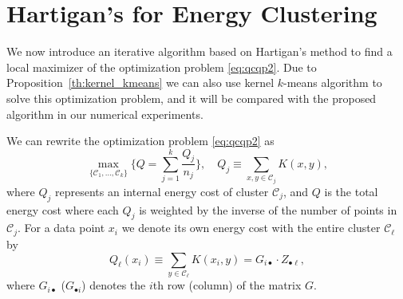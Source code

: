 \documentclass[twoside]{article}
\newcommand\kk{K}
\newcommand\C{{\mathcal{C}}}
\begin{document}
\section{Hartigan's for Energy Clustering}
\label{sec:algo}

We now introduce an iterative algorithm based
on Hartigan's method \citep{Hartigan} to find a local
maximizer of the optimization problem \eqref{eq:qcqp2}. Due to 
Proposition~\ref{th:kernel_kmeans} we can also use 
kernel $k$-means algorithm \citep{Dhillon2,Dhillon} to solve
this optimization problem, and it
will be compared with the proposed algorithm in our numerical experiments. 

We can rewrite the optimization problem \eqref{eq:qcqp2} as
\begin{equation}
\label{eq:maxQ}
\max_{\{ \C_1,\dotsc,\C_k \}} 
\bigg\{ Q = \sum_{j=1}^k \dfrac{Q_j}{n_j}  \bigg\},
\quad Q_j \equiv \sum_{x,y\in\C_j} \kk(x,y),
\end{equation}
where $Q_j$ represents an internal energy cost of cluster $\C_j$, and
$Q$ is the total energy cost where each $Q_j$ 
is weighted by the inverse
of the number of points in $\C_j$. For a data point $x_i$ we denote
its own energy cost
with the entire cluster $\C_\ell$ by
\begin{equation}
\label{eq:costxij}
Q_\ell(x_i) \equiv \sum_{y\in\C_\ell} \kk(x_i, y) = 
G_{i \bullet} \cdot Z_{\bullet \ell},
\end{equation}
where $G_{i\bullet}$ ($G_{\bullet i}$) denotes
the $i$th row (column) of the matrix $G$.
\end{document}
